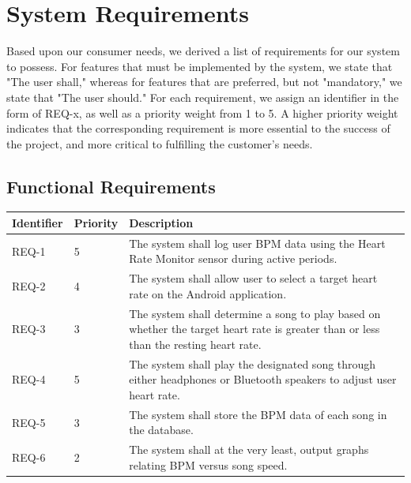 \documentclass[letterpaper,english, 12pt]{scrreprt}
\begin{document}
\chapter{System Requirements}
Based upon our consumer needs, we derived a list of requirements for our system to
possess. For features that must be implemented by the system, we state that "The
user shall," whereas for features that are preferred, but not "mandatory," we state
that "The user should." For each requirement, we assign an identifier in the form of
REQ-x, as well as a priority weight from 1 to 5. A higher priority weight indicates
that the corresponding requirement is more essential to the success of the project,
and more critical to fulfilling the customer's needs.

\section{Functional Requirements}
\begin{center}
	\begin{tabular}{|C{2cm}|C{2cm}|C{8cm}|}
		\hline
			Identifier & Priority & Description\\
		\hline
			REQ-1 & 5 & The system shall log user BPM data using the Heart Rate Monitor sensor during active periods.\\
		\hline
			REQ-2 & 4 & The system shall allow user to select a target heart rate on the Android application.\\
		\hline
			REQ-3 & 3 & The system shall determine a song to play based on whether the target heart rate is greater than or less than the resting heart rate. \\
		\hline
			REQ-4 & 5 & The system shall play the designated song through either headphones or Bluetooth speakers to adjust user heart rate. \\
		\hline
			REQ-5 & 3 & The system shall store the BPM data of each song in the database. \\
		\hline
			REQ-6 & 2 & The system shall at the very least, output graphs relating BPM versus song speed.\\
        \hline
    \end{tabular}
\end{center}
\end{document}
